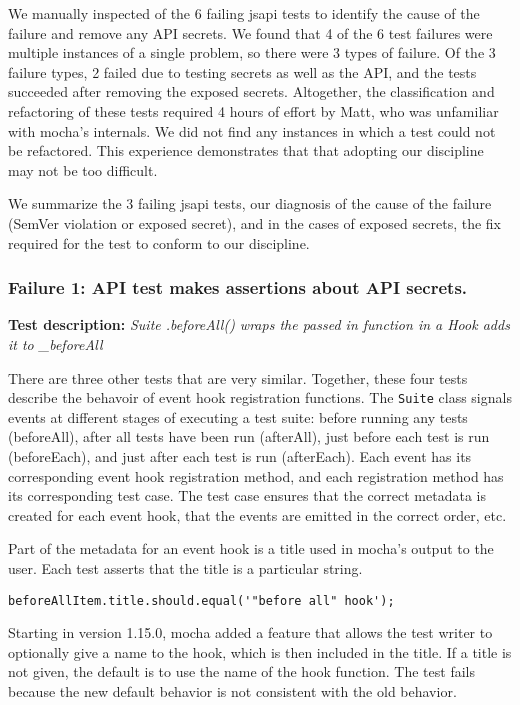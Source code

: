 We manually inspected of the 6 failing jsapi tests to identify the
cause of the failure and remove any API secrets. We found that 4 of
the 6 test failures were multiple instances of a single problem, so
there were 3 types of failure. Of the 3 failure types, 2 failed due to
testing secrets as well as the API, and the tests succeeded after
removing the exposed secrets. Altogether, the classification and
refactoring of these tests required 4 hours of effort by Matt, who was
unfamiliar with mocha's internals. We did not find any instances in
which a test could not be refactored. This experience demonstrates
that that adopting our discipline may not be too difficult.

We summarize the 3 failing jsapi tests, our diagnosis of the cause of
the failure (SemVer violation or exposed secret), and in the cases of
exposed secrets, the fix required for the test to conform to our
discipline.

\subsubsection{Failure 1: API test makes assertions about API secrets.}
{\bf Test description: } {\em Suite .beforeAll() wraps the passed in
function in a Hook adds it to \_beforeAll}
\label{sec:failure1}

\/There are three other tests that are very similar. Together, these
four tests describe the behavoir of event hook registration
functions. The {\tt Suite} class signals events at different stages of
executing a test suite: before running any tests (beforeAll), after
all tests have been run (afterAll), just before each test is run
(beforeEach), and just after each test is run (afterEach). Each event
has its corresponding event hook registration method, and each
registration method has its corresponding test case. The test case
ensures that the correct metadata is created for each event hook, that
the events are emitted in the correct order, etc.

Part of the metadata for an event hook is a title used in mocha's
output to the user. Each test asserts that the title is a particular
string.

{\small
\begin{verbatim}
beforeAllItem.title.should.equal('"before all" hook');
\end{verbatim}
}

Starting in version 1.15.0, mocha added a feature that allows the test
writer to optionally give a name to the hook, which is then included
in the title. If a title is not given, the default is to use the name
of the hook function. The test fails because the new default behavior
is not consistent with the old behavior.


